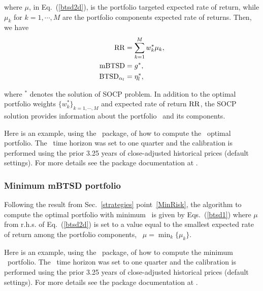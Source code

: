 \noindent where $\mu$, in Eq.~(\ref{btsd2d}), is the portfolio targeted expected rate of return, while $\mu_k$ for $k = 1,\cdots,M$
are the portfolio components expected rate of returns.
Then, we have
\begin{subequations}\label{btsd3}
\begin{align}
    \RR &= \sum_{k=1}^M w_k^* \mu_k, \label{btsd3a} \\
    \mBTSD &= g^*, \label{btsd13b} \\
    \BTSD_{\alpha_l} &= \eta_l^*, \label{btsd3c}
\end{align}
\end{subequations}

\noindent where $^*$ denotes the solution of  SOCP problem.
In addition to the optimal portfolio weights $\{w_k^*\}_{k=1,\cdots,M}$ and
expected rate of return ${\rm RR}$, the
SOCP solution provides information about the portfolio \mBTSD\ and its components.

\bigskip
\noindent Here is an example, using the \azapy\ package, of how to compute the \mBTSD\ optimal portfolio.
The \mBTSD\ time horizon was set to one quarter and the calibration is performed using the prior 3.25 years of
close-adjusted historical prices (default settings).
For more details see the package documentation at \azapydoc.



\BackToContents


\subsubsection{Minimum mBTSD portfolio}

Following the result from Sec.~\ref{strategies} point~\ref{MinRisk},
the algorithm to compute the optimal portfolio with minimum \mBTSD\ is given by Eqs.~(\ref{btsd1}) where
$\mu$ from r.h.s. of Eq.~(\ref{btsd2d}) is set to a value equal to the smallest expected rate of
return among the portfolio components, \ie\ $\mu=\min_k\{\mu_k\}$.

\bigskip
\noindent Here is an example, using the \azapy\ package, of how to compute the minimum \mBTSD\ portfolio.
The \mBTSD\ time horizon was set to one quarter and the calibration is performed using the prior 3.25 years of
close-adjusted historical prices (default settings).
For more details see the package documentation at \azapydoc.



